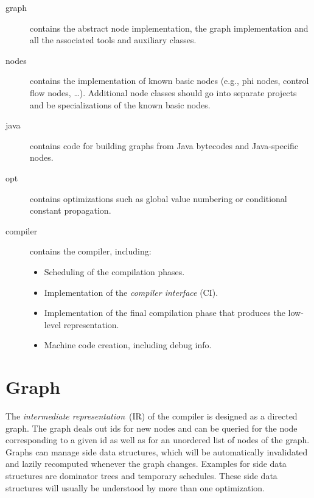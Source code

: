 \documentclass[twocolumn]{svjour3}
\begin{document}
\begin{description}
    \item[graph] contains the abstract node implementation, the graph implementation and all the associated tools and auxiliary classes.
    \item[nodes] contains the implementation of known basic nodes (e.g., phi nodes, control flow nodes, \ldots).
 				 Additional node classes should go into separate projects and be specializations of the known basic nodes.
    \item[java] contains code for building graphs from Java bytecodes and Java-specific nodes.
    \item[opt] contains optimizations such as global value numbering or conditional constant propagation.
    \item[compiler] contains the compiler, including:
        \begin{itemize}
            \item Scheduling of the compilation phases.
            \item Implementation of the \emph{compiler interface} (CI).
            \item Implementation of the final compilation phase that produces the low-level representation.
            \item Machine code creation, including debug info.
        \end{itemize}
\end{description}


\section{Graph}

The \emph{intermediate representation}~(IR) of the compiler is designed as a directed graph.
The graph deals out ids for new nodes and can be queried for the node corresponding to a given id as well as for an unordered list of nodes of the graph.
Graphs can manage side data structures, which will be automatically invalidated and lazily recomputed whenever the graph changes. Examples for side data structures are dominator trees and temporary schedules. These side data structures will usually be understood by more than one optimization.
\end{document}
